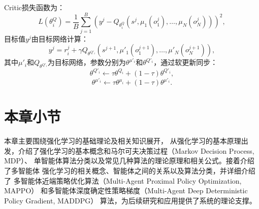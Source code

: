 Critic损失函数为：
\begin{equation}\label{式2-11}
    L(\theta^Q_i) = \frac{1}{B} \sum_{j=1}^B \left( y^j - Q_{\theta^Q_i} \left( s^j, \mu_1(o_1^j), \dots, \mu_N(o_N^j) \right) \right)^2,
\end{equation}
目标值\(y^j\)由目标网络计算：
\begin{equation}\label{式2-12}
    y^j = r_i^j + \gamma Q_{\theta^{Q'_i}} \left( s^{j+1}, \mu'_1(o_1^{j+1}), \dots, \mu'_N(o_N^{j+1}) \right),
\end{equation}
其中\(\mu'_i\)和\(Q_{\theta^{Q'_i}}\)为目标网络，参数分别为$\theta^{\mu'_i} $和$\theta^{Q'_i}$，通过软更新同步：
\begin{equation}\label{式2-13}
\theta^{Q'_i} \leftarrow \tau \theta^{Q_i} + (1-\tau)\theta^{Q'_i},
\end{equation}
\begin{equation}\label{式2-14}
 \theta^{\mu'_i} \leftarrow \tau \theta^{\mu_i} + (1-\tau)\theta^{\mu'_i}.
\end{equation}


\section{本章小节}
本章主要围绕强化学习的基础理论及相关知识展开，
从强化学习的基本原理出发，介绍了强化学习的基本概念和马尔可夫决策过程（Markov Decision Process, MDP）、
单智能体算法分类以及常见几种算法的理论原理和相关公式。接着介绍了多智能体
强化学习的相关概念、智能体之间的关系以及算法分类，并详细介绍了
多智能体近端策略优化算法（Multi-Agent Proximal Policy Optimization, MAPPO）
和多智能体深度确定性策略梯度（Multi-Agent Deep Deterministic Policy Gradient, MADDPG）
算法，为后续研究和应用提供了系统的理论支撑。



